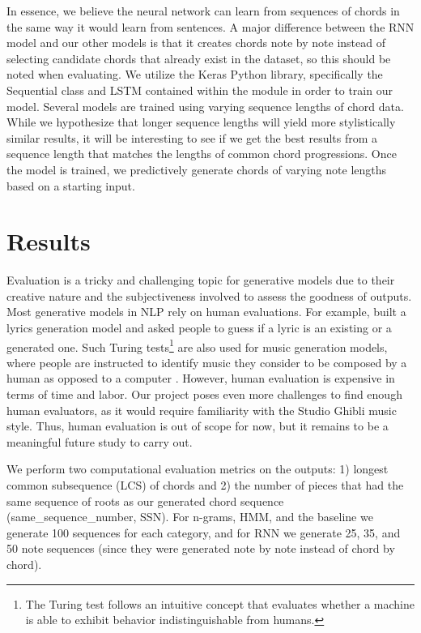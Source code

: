 \documentclass[11pt,a4paper]{article}
\begin{document}
In essence, we believe the neural network can learn from sequences of chords in the same way it would learn from sentences. A major difference between the RNN model and our other models is that it creates chords note by note instead of selecting candidate chords that already exist in the dataset, so this should be noted when evaluating. We utilize the Keras Python library, specifically the Sequential class and LSTM contained within the module in order to train our model. Several models are trained using varying sequence lengths of chord data. While we hypothesize that longer sequence lengths will yield more stylistically similar results, it will be interesting to see if we get the best results from a sequence length that matches the lengths of common chord progressions. Once the model is trained, we predictively generate chords of varying note lengths based on a starting input.


\section{Results}
Evaluation is a tricky and challenging topic for generative models due to their creative nature and the subjectiveness involved to assess the goodness of outputs. Most generative models in NLP rely on human evaluations. For example, \citet{pudaruth2014} built a lyrics generation model and asked people to guess if a lyric is an existing or a generated one. Such Turing tests\footnote{The Turing test follows an intuitive concept that evaluates whether a machine is able to exhibit behavior indistinguishable from humans.} are also used for music generation models, where people are instructed to identify music they consider to be composed by a human as opposed to a computer \citep{ariza2009, yang2020}. However, human evaluation is expensive in terms of time and labor. Our project poses even more challenges to find enough human evaluators, as it would require familiarity with the Studio Ghibli music style. Thus, human evaluation is out of scope for now, but it remains to be a meaningful future study to carry out.

We perform two computational evaluation metrics on the outputs: 1) longest common subsequence (LCS) of chords and 2) the number of pieces that had the same sequence of roots as our generated chord sequence (same\_sequence\_number, SSN). For n-grams, HMM, and the baseline we generate 100 sequences for each category, and for RNN we generate 25, 35, and 50 note sequences (since they were generated note by note instead of chord by chord). 
\end{document}
